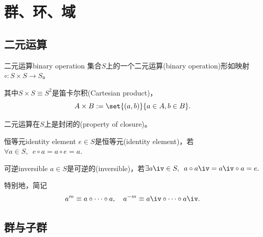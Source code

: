 \chapter{群、环、域}

\section{二元运算}

\begin{definition}{二元运算}{binary operation}
	集合$S$上的一个二元运算(binary operation)形如映射$\circ:S\times S\to S$。

	其中$S\times S\equiv S^2$是笛卡尔积(Cartesian product)，
	\[
		A\times B:=\set{(a,b)}{a\in A, b\in B}.
	\]
\end{definition}
二元运算在$S$上是封闭的(property of closure)。
\begin{definition}{恒等元}{identity element}
	$e\in S$是恒等元(identity element)，若$\forall a\in S,\enspace e\circ a=a\circ e=a.$
\end{definition}
\begin{definition}{可逆}{inversible}
	$a\in S$是可逆的(inversible)，若$\exists a\iv\in S,\enspace a\circ a\iv=a\iv\circ a=e.$
\end{definition}
特别地，简记
\[
	a^m\equiv a\circ\cdots\circ a,\quad a^{-m}\equiv a\iv\circ\cdots\circ a\iv.
\]

\section{群与子群}

